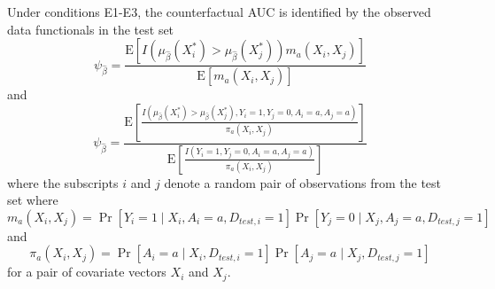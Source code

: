 \begin{theorem}
    Under conditions E1-E3, the counterfactual AUC is identified by the observed data functionals in the test set
\begin{equation}\label{eqn:cl_auc_estimand}
    \psi_{\widehat{\beta}} = \frac{\mathrm{E}\left[I\left(\mu_{\widehat{\beta}}(X_i^*)>\mu_{\widehat{\beta}}(X_j^*)\right)m_a(X_i, X_j) \right]}{\mathrm{E}\left[m_a(X_i, X_j) \right]} 
\end{equation}
and 
\begin{equation}\label{eqn:ipw_auc_estimand}
    \psi_{\widehat{\beta}} = \frac{\mathrm{E}\left[\frac{I\left(\mu_{\widehat{\beta}}(X_i^*)>\mu_{\widehat{\beta}}(X_j^*), Y_i=1, Y_j=0, A_i = a, A_j = a\right)}{\pi_a(X_i, X_j)} \right]}{\mathrm{E}\left[\frac{I\left(Y_i=1, Y_j=0, A_i = a, A_j = a\right)}{\pi_a(X_i, X_j)}\right]} 
\end{equation}
where the subscripts $i$ and $j$ denote a random pair of observations from the test set where
\begin{equation*}
    m_a(X_i, X_j) = \operatorname{Pr}\left[Y_i=1 \mid X_i,A_i = a, D_{test,i} = 1\right] \Pr\left[ Y_j=0 \mid X_j, A_j = a, D_{test,j} = 1\right]
\end{equation*}
and 
\begin{equation*}
    \pi_a(X_i, X_j) = \Pr\left[A_i = a \mid X_i, D_{test,i} = 1\right] \Pr\left[A_j = a  \mid X_j, D_{test,j} = 1\right]
\end{equation*}
for a pair of covariate vectors $X_i$ and $X_j$. 
\end{theorem}

